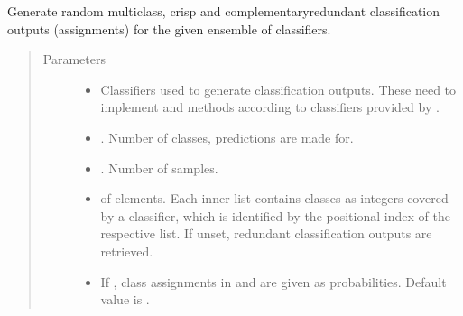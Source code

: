 \documentclass[letterpaper,10pt,english]{sphinxmanual}
\begin{document}
\begin{fulllineitems}
\label{\detokenize{pusion.util.generator:pusion.util.generator.generate_multiclass_cr_ensemble_classification_outputs}}
\sphinxAtStartPar
Generate random multiclass, crisp and complementary\sphinxhyphen{}redundant classification outputs (assignments) for the given
ensemble of classifiers.
\begin{quote}\begin{description}
\item[{Parameters}] \leavevmode\begin{itemize}
\item {} 
\sphinxAtStartPar
{} \textendash{} Classifiers used to generate classification outputs.
These need to implement  and  methods according to classifiers provided by .

\item {} 
\sphinxAtStartPar
{} \textendash{} . Number of classes, predictions are made for.

\item {} 
\sphinxAtStartPar
{} \textendash{} . Number of samples.

\item {} 
\sphinxAtStartPar
{} \textendash{}  of  elements. Each inner list contains classes as integers covered by a classifier,
which is identified by the positional index of the respective list.
If unset, redundant classification outputs are retrieved.

\item {} 
\sphinxAtStartPar
{} \textendash{} If , class assignments in  and  are given as
probabilities. Default value is .


\end{itemize}
\end{description}
\end{quote}
\end{fulllineitems}
\end{document}
